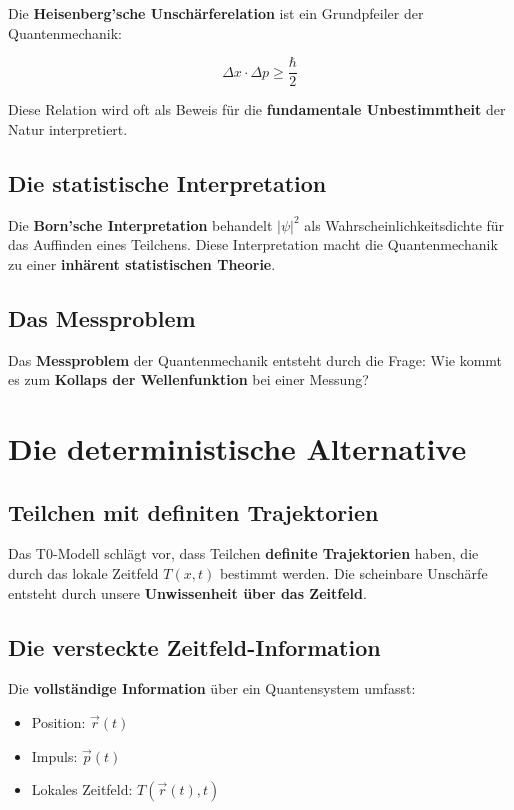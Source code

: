 \documentclass[12pt,a4paper]{report}
\begin{document}
	Die \textbf{Heisenberg'sche Unschärferelation} ist ein Grundpfeiler der Quantenmechanik:
	
	\begin{equation}
		\Delta x \cdot \Delta p \geq \frac{\hbar}{2}
	\end{equation}
	
	Diese Relation wird oft als Beweis für die \textbf{fundamentale Unbestimmtheit} der Natur interpretiert.
	
	\subsection{Die statistische Interpretation}
	
	Die \textbf{Born'sche Interpretation} behandelt $|\psi|^2$ als Wahrscheinlichkeitsdichte für das Auffinden eines Teilchens. Diese Interpretation macht die Quantenmechanik zu einer \textbf{inhärent statistischen Theorie}.
	
	\subsection{Das Messproblem}
	
	Das \textbf{Messproblem} der Quantenmechanik entsteht durch die Frage: Wie kommt es zum \textbf{Kollaps der Wellenfunktion} bei einer Messung?
	
	\section{Die deterministische Alternative}
	
	\subsection{Teilchen mit definiten Trajektorien}
	
	Das T0-Modell schlägt vor, dass Teilchen \textbf{definite Trajektorien} haben, die durch das lokale Zeitfeld $T(x,t)$ bestimmt werden. Die scheinbare Unschärfe entsteht durch unsere \textbf{Unwissenheit über das Zeitfeld}.
	
	\subsection{Die versteckte Zeitfeld-Information}
	
	Die \textbf{vollständige Information} über ein Quantensystem umfasst:
	\begin{itemize}
		\item Position: $\vec{r}(t)$
		\item Impuls: $\vec{p}(t)$
		\item Lokales Zeitfeld: $T(\vec{r}(t),t)$
	\end{itemize}
	
\end{document}
